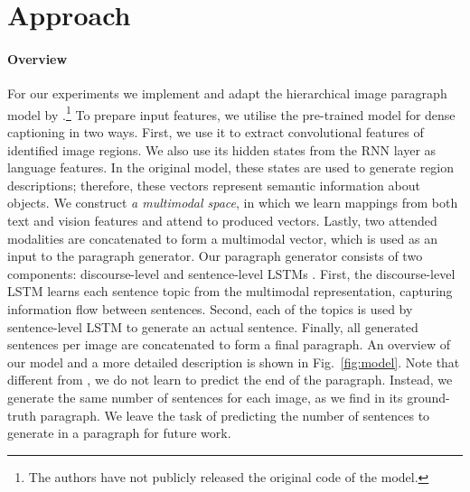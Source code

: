 \documentclass[11pt,a4paper]{article}
\newcommand{\kibitz}[2]{\ifnum\Comments=1\textcolor{#1}{#2}\fi}
\newcommand{\nikolai}[1]{\kibitz{red}   {[Nikolai: #1]}}
\begin{document}
\section{Approach}
\paragraph{Overview}
For our experiments we implement and adapt the hierarchical image paragraph model by \cite{krause2016hierarchical}.\footnote{The authors have not publicly released the original code of the model.}
To prepare input features, we utilise the pre-trained model for dense captioning \cite{densecap} in two ways.
First, we use it to extract convolutional features of identified image regions.
We also use its hidden states from the RNN layer as language features.
In the original model, these states are used to generate region descriptions; therefore, these vectors represent semantic information about objects.
We construct \textit{a multimodal space}, in which we learn mappings from both text and vision features and attend to produced vectors.
Lastly, two attended modalities are concatenated to form a multimodal vector, which is used as an input to the paragraph generator.
Our paragraph generator consists of two components: discourse-level and sentence-level LSTMs \cite{lstm97}.
First, the discourse-level LSTM learns each sentence topic from the multimodal representation, capturing information flow between sentences.
Second, each of the topics is used by sentence-level LSTM to generate an actual sentence.
Finally, all generated sentences per image are concatenated to form a final paragraph.
An overview of our model and a more detailed description is shown in Fig.~\ref{fig:model}.
Note that different from , we do not learn to predict the end of the paragraph.
Instead, we generate the same number of sentences for each image, as we find in its ground-truth paragraph.
We leave the task of predicting the number of sentences to generate in a paragraph for future work.

\end{document}
